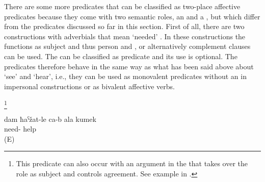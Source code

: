 There are some more predicates that can be classified as two-place affective predicates because they come with two semantic roles, an  and a , but which differ from the predicates discussed so far in this section. First of all, there are two  constructions with adverbials that mean `needed' . In these constructions the   functions as  subject and thus person and   , or alternatively complement clauses can be used. The  can be classified as  predicate and its use is optional. The predicates therefore behave in the same way as what has been said above about `see' and `hear', i.e., they can be used as monovalent predicates without an  in impersonal constructions or as bivalent affective verbs.

\begin{exe}
	\ex	\label{ex:copula constructions with absolutive stimulus}
	\begin{xlist}
		\ex	{} \footnote{This predicate can also occur with an  argument in the  that takes over the role as  subject and controls agreement. See example  in .}
		\ex	{} 
	\end{xlist}
	
	
	\ex	\label{ex:I need your help.AFF}
	\gll	dam	ħaˁžat-le	ca-b	ala	kumek\\
			need-			help\\
	\glt	{} (E)
\end{exe}


